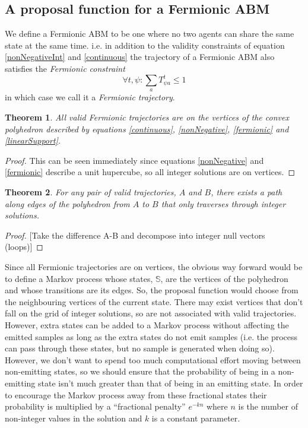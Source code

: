 \documentclass{article}
\newtheorem{theorem}{Theorem}
\begin{document}
\subsection{A proposal function for a Fermionic ABM}

We define a Fermionic ABM to be one where no two agents can share the same state at the same time. i.e. in addition to the validity constraints of equation \ref{nonNegativeInt} and \ref{continuous} the trajectory of a Fermionic ABM also satisfies the \textit{Fermionic constraint}
\begin{equation}
\forall t,\psi: \sum_a T^t_{\psi a} \le 1
\label{fermionic}
\end{equation}
in which case we call it a \textit{Fermionic trajectory}.

\begin{theorem}
All valid Fermionic trajectories are on the vertices of the convex polyhedron described by equations \ref{continuous}, \ref{nonNegative}, \ref{fermionic} and \ref{linearSupport}.
\end{theorem}
\begin{proof}
This can be seen immediately since equations \ref{nonNegative} and \ref{fermionic} describe a unit hupercube, so all integer solutions are on vertices.
\end{proof}

\begin{theorem}
For any pair of valid trajectories, $A$ and $B$, there exists a path along edges of the polyhedron from $A$ to $B$ that only traverses through integer solutions.
\end{theorem}
\begin{proof}

[Take the difference A-B and decompose into integer null vectors (loops)]

\end{proof}

Since all Fermionic trajectories are on vertices, the obvious way forward would be to define a Markov process whose states, $\mathbb{S}$, are the vertices of the polyhedron and whose transitions are its edges. So, the proposal function would choose from the neighbouring vertices of the current state. There may exist vertices that don't fall on the grid of integer solutions, so are not associated with valid trajectories. However, extra states can be added to a Markov process without affecting the emitted samples as long as the extra states do not emit samples (i.e. the process can pass through these states, but no sample is generated when doing so). However, we don't want to spend too much computational effort moving between non-emitting states, so we should ensure that the probability of being in a non-emitting state isn't much greater than that of being in an emitting state. In order to encourage the Markov process away from these fractional states their probability is multiplied by a ``fractional penalty'' $e^{-kn}$ where $n$ is the number of non-integer values in the solution and $k$ is a constant parameter.
\end{document}
